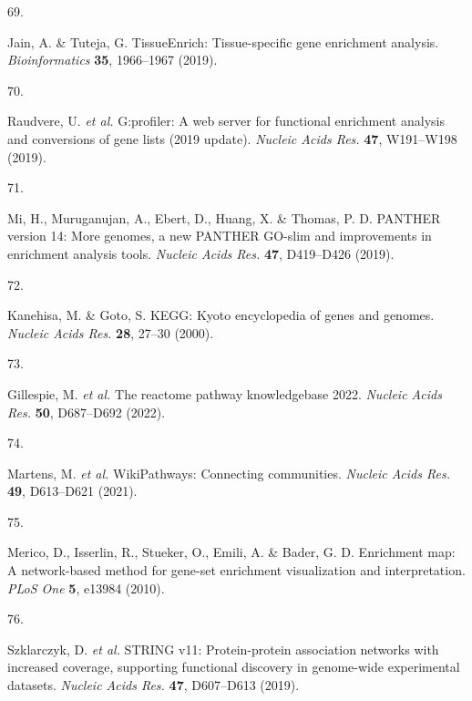 \documentclass[
  11,
  a4paper,
]{article}
\newlength{\cslhangindent}
\newlength{\csllabelwidth}
\newlength{\cslentryspacingunit} %
\newenvironment{CSLReferences}[2] %
 {%
  \setlength{\parindent}{0pt}
  \ifodd #1
  \let\oldpar\par
  \def\par{\hangindent=\cslhangindent\oldpar}
  \fi
  \setlength{\parskip}{#2\cslentryspacingunit}
 }%
 {}
\newcommand{\CSLLeftMargin}[1]{\parbox[t]{\csllabelwidth}{#1}}
\newcommand{\CSLRightInline}[1]{\parbox[t]{\linewidth - \csllabelwidth}{#1}\break}
\begin{document}
\begin{CSLReferences}{0}{0}
\leavevmode{}%
\CSLLeftMargin{69. }%
\CSLRightInline{Jain, A. \& Tuteja, G. {TissueEnrich}: Tissue-specific
gene enrichment analysis. \emph{Bioinformatics} \textbf{35}, 1966--1967
(2019).}

\leavevmode{}%
\CSLLeftMargin{70. }%
\CSLRightInline{Raudvere, U. \emph{et al.} G:profiler: A web server for
functional enrichment analysis and conversions of gene lists (2019
update). \emph{Nucleic Acids Res.} \textbf{47}, W191--W198 (2019).}

\leavevmode{}%
\CSLLeftMargin{71. }%
\CSLRightInline{Mi, H., Muruganujan, A., Ebert, D., Huang, X. \& Thomas,
P. D. {PANTHER} version 14: More genomes, a new {PANTHER} {GO-slim} and
improvements in enrichment analysis tools. \emph{Nucleic Acids Res.}
\textbf{47}, D419--D426 (2019).}

\leavevmode{}%
\CSLLeftMargin{72. }%
\CSLRightInline{Kanehisa, M. \& Goto, S. {KEGG}: Kyoto encyclopedia of
genes and genomes. \emph{Nucleic Acids Res.} \textbf{28}, 27--30
(2000).}

\leavevmode{}%
\CSLLeftMargin{73. }%
\CSLRightInline{Gillespie, M. \emph{et al.} The reactome pathway
knowledgebase 2022. \emph{Nucleic Acids Res.} \textbf{50}, D687--D692
(2022).}

\leavevmode{}%
\CSLLeftMargin{74. }%
\CSLRightInline{Martens, M. \emph{et al.} {WikiPathways}: Connecting
communities. \emph{Nucleic Acids Res.} \textbf{49}, D613--D621 (2021).}

\leavevmode{}%
\CSLLeftMargin{75. }%
\CSLRightInline{Merico, D., Isserlin, R., Stueker, O., Emili, A. \&
Bader, G. D. Enrichment map: A network-based method for gene-set
enrichment visualization and interpretation. \emph{PLoS One} \textbf{5},
e13984 (2010).}

\leavevmode{}%
\CSLLeftMargin{76. }%
\CSLRightInline{Szklarczyk, D. \emph{et al.} {STRING} v11:
Protein-protein association networks with increased coverage, supporting
functional discovery in genome-wide experimental datasets. \emph{Nucleic
Acids Res.} \textbf{47}, D607--D613 (2019).}

\end{CSLReferences}
\end{document}
